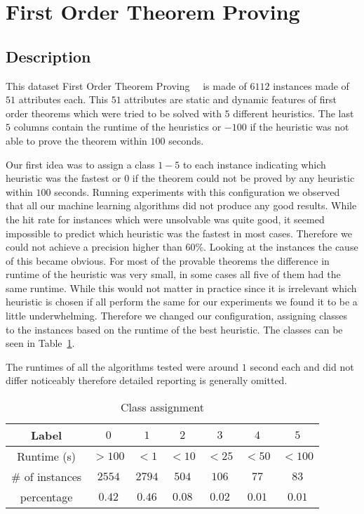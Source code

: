 \section{First Order Theorem Proving}
\label{db:sec:ds2}
\subsection{Description}
This dataset First Order Theorem Proving~\cite{ds2:uci}~\cite{ds2:paper} is made of $6112$ instances made of $51$ attributes each. This $51$ attributes are static and dynamic features of first order theorems which were tried to be solved with $5$ different heuristics. The last $5$ columns contain the runtime of the heuristics or $-100$ if the heuristic was not able to prove the theorem within $100$ seconds.\par
Our first idea was to assign a class $1-5$ to each instance indicating which heuristic was the fastest or $0$ if the theorem could not be proved by any heuristic within $100$ seconds. Running experiments with this configuration we observed that all our machine learning algorithms did not produce any good results. While the hit rate for instances which were unsolvable was quite good, it seemed impossible to predict which heuristic was the fastest in most cases. Therefore we could not achieve a precision higher than $60\%$.
Looking at the instances the cause of this became obvious. For most of the provable theorems the difference in runtime of the heuristic was very small, in some cases all five of them had the same runtime. While this would not matter in practice since it is irrelevant which heuristic is chosen if all perform the same for our experiments we found it to be a little underwhelming. Therefore we changed our configuration, assigning classes to the instances based on the runtime of the best heuristic. The classes can be seen in Table~\ref{ds2:table:classes}.
\par The runtimes of all the algorithms tested were around $1$ second each and did not differ noticeably therefore detailed reporting is generally omitted.
\begin{table}[h]
	\begin{center}
	\begin{tabular}{c|c|c|c|c|c|c} 

		Label & $0$ & $1$ & $2$ & $3$ & $4$ & $5$\\\hline
		Runtime (s) & $>100$ & $<1$ & $<10$ & $<25$ & $<50$ &$<100$\\\hline
		$\#$ of instances & $2554$ & $2794$ & $504$ & $106$ & $77$ & $83$\\\hline
		percentage & $0.42$ & $0.46$ & $0.08$ & $0.02$ & $0.01$ & $0.01$\\\hline

	\end{tabular}
\end{center}
	\caption{Class assignment \label{ds2:table:classes}}
\end{table}
